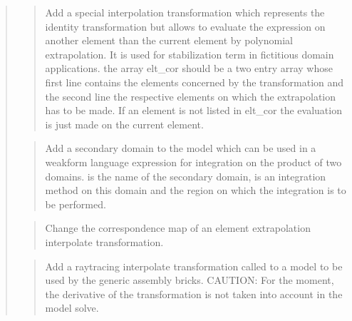 \documentclass[a4paper,11pt,english]{sphinxmanual}
\begin{document}
\begin{quote}
\sphinxAtStartPar
{}
\begin{quote}

\sphinxAtStartPar
Add a special interpolation transformation which represents the identity
transformation but allows to evaluate the expression on another element
than the current element by polynomial extrapolation. It is used for
stabilization term in fictitious domain applications. the array elt\_cor
should be a two entry array whose first line contains the elements
concerned by the transformation and the second line the respective
elements on which the extrapolation has to be made. If an element
is not listed in elt\_cor the evaluation is just made on the current
element.
\end{quote}

\sphinxAtStartPar
{}
\begin{quote}

\sphinxAtStartPar
Add a secondary domain to the model which can be used in a weak\sphinxhyphen{}form language expression for integration on the product of two domains.  is the name
of the secondary domain,  is an integration method on this domain
and  the region on which the integration is to be performed.
\end{quote}

\sphinxAtStartPar
{}
\begin{quote}

\sphinxAtStartPar
Change the correspondence map of an element extrapolation interpolate
transformation.
\end{quote}

\sphinxAtStartPar
{}
\begin{quote}

\sphinxAtStartPar
Add a raytracing interpolate transformation called  to a model
to be used by the generic assembly bricks.
CAUTION: For the moment, the derivative of the
transformation is not taken into account in the model solve.
\end{quote}


\end{quote}
\end{document}
